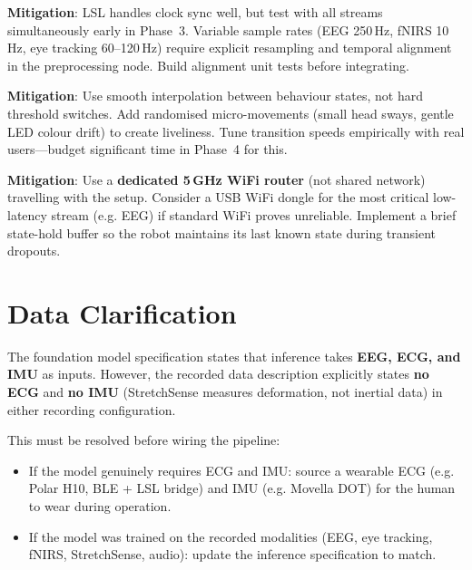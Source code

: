 \documentclass[11pt,a4paper]{article}
\begin{document}
\begin{riskbox}[title={\faExclamationTriangle\ Risk 2: Multi-Stream Synchronisation}]
\textbf{Mitigation}: LSL handles clock sync well, but test with all streams simultaneously early in Phase~3. Variable sample rates (EEG 250\,Hz, fNIRS 10\,Hz, eye tracking 60--120\,Hz) require explicit resampling and temporal alignment in the preprocessing node. Build alignment unit tests before integrating.
\end{riskbox}

\begin{riskbox}[title={\faExclamationTriangle\ Risk 3: Uncanny / Robotic Behaviour}]
\textbf{Mitigation}: Use smooth interpolation between behaviour states, not hard threshold switches. Add randomised micro-movements (small head sways, gentle LED colour drift) to create liveliness. Tune transition speeds empirically with real users---budget significant time in Phase~4 for this.
\end{riskbox}

\begin{riskbox}[title={\faExclamationTriangle\ Risk 4: WiFi Latency or Dropout}]
\textbf{Mitigation}: Use a \textbf{dedicated 5\,GHz WiFi router} (not shared network) travelling with the setup. Consider a USB WiFi dongle for the most critical low-latency stream (e.g. EEG) if standard WiFi proves unreliable. Implement a brief state-hold buffer so the robot maintains its last known state during transient dropouts.
\end{riskbox}


\section{Data Clarification}
\label{sec:clarification}

\begin{riskbox}[title={\faExclamationTriangle\ Important: Input Modality Mismatch}]
The foundation model specification states that inference takes \textbf{EEG, ECG, and IMU} as inputs. However, the recorded data description explicitly states \textbf{no ECG} and \textbf{no IMU} (StretchSense measures deformation, not inertial data) in either recording configuration.

\medskip\noindent
This must be resolved before wiring the pipeline:
\begin{itemize}[leftmargin=1.5em, nosep]
  \item If the model genuinely requires ECG and IMU: source a wearable ECG (e.g. Polar H10, BLE + LSL bridge) and IMU (e.g. Movella DOT) for the human to wear during operation.
  \item If the model was trained on the recorded modalities (EEG, eye tracking, fNIRS, StretchSense, audio): update the inference specification to match.
\end{itemize}
\end{riskbox}
\end{document}
